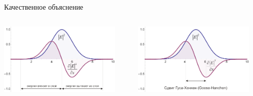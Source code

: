 \documentclass[9pt, compress, xcolor=table]{beamer}
\begin{document}
\begin{frame}{Качественное объяснение}
\begin{columns}[c]
\column{6.5cm}
\begin{center}
\includegraphics[width=0.9\textwidth]{Goos-Hanchen_effect_Gauss}
\end{center}
\column{6.5cm}
\begin{center}
\includegraphics[width=0.9\textwidth]{Goos-Hanchen_effect_Gauss_shift}
\end{center}
\end{columns}
\end{frame}

\end{document}
